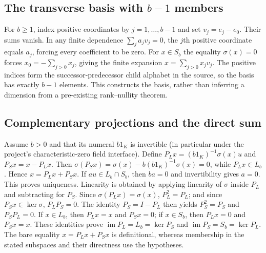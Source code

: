 \subsection{The transverse basis with $b-1$ members}\label{supp:8-6}
\par{}\par\smallskip

For $b\ge1$, index positive coordinates by $j=1,\ldots,b-1$ and set $v_j=e_j-e_0$. Their sums vanish. In any finite dependence $\sum_j a_jv_j=0$, the $j$th positive coordinate equals $a_j$, forcing every coefficient to be zero. For $x\in S_b$ the equality $\sigma(x)=0$ forces $x_0=-\sum_{j>0}x_j$, giving the finite expansion $x=\sum_{j>0}x_jv_j$. The positive indices form the successor-predecessor child alphabet in the source, so the basis has exactly $b-1$ elements. This constructs the basis, rather than inferring a dimension from a pre-existing rank--nullity theorem.

\subsection{Complementary projections and the direct sum}\label{supp:8-7}
\par{}\par\smallskip

Assume $b>0$ and that its numeral $b1_K$ is invertible (in particular under the project's characteristic-zero field interface). Define $P_Lx=(b1_K)^{-1}\sigma(x)u$ and $P_Sx=x-P_Lx$. Then $\sigma(P_Sx)=\sigma(x)-b(b1_K)^{-1}\sigma(x)=0$, while $P_Lx\in L_b$. Hence $x=P_Lx+P_Sx$. If $au\in L_b\cap S_b$, then $ba=0$ and invertibility gives $a=0$. This proves uniqueness. Linearity is obtained by applying linearity of $\sigma$ inside $P_L$ and subtracting for $P_S$. Since $\sigma(P_Lx)=\sigma(x)$, $P_L^2=P_L$; and since $P_Sx\in\ker\sigma$, $P_LP_S=0$. The identity $P_S=I-P_L$ then yields $P_S^2=P_S$ and $P_SP_L=0$. If $x\in L_b$, then $P_Lx=x$ and $P_Sx=0$; if $x\in S_b$, then $P_Lx=0$ and $P_Sx=x$. These identities prove $\operatorname{im}P_L=L_b=\ker P_S$ and $\operatorname{im}P_S=S_b=\ker P_L$. The bare equality $x=P_Lx+P_Sx$ is definitional, whereas membership in the stated subspaces and their directness use the hypotheses.

